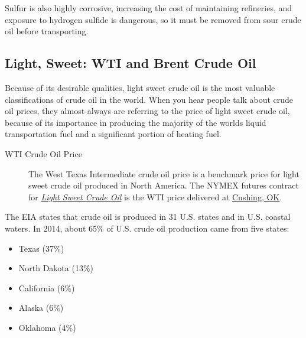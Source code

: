 \documentclass[
  letterpaper,
  DIV=11,
  numbers=noendperiod]{scrreprt}
\providecommand{\tightlist}{%
  \setlength{\itemsep}{0pt}\setlength{\parskip}{0pt}}\usepackage{longtable,booktabs,array}
\begin{document}
Sulfur is also highly corrosive, increasing the cost of maintaining
refineries, and exposure to hydrogen sulfide is dangerous, so it must be
removed from sour crude oil before transporting.

\hypertarget{light-sweet-wti-and-brent-crude-oil}{%
\subsection{Light, Sweet: WTI and Brent Crude
Oil}\label{light-sweet-wti-and-brent-crude-oil}}

Because of its desirable qualities, light sweet crude oil is the most
valuable classifications of crude oil in the world. When you hear people
talk about crude oil prices, they almost always are referring to the
price of light sweet crude oil, because of its importance in producing
the majority of the worlds liquid transportation fuel and a significant
portion of heating fuel.

\begin{description}
\item[WTI Crude Oil Price]
The West Texas Intermediate crude oil price is a benchmark price for
light sweet crude oil produced in North America. The NYMEX futures
contract for
\href{http://www.cmegroup.com/trading/energy/crude-oil/light-sweet-crude.html}{\emph{Light
Sweet Crude Oil}} is the WTI price delivered at
\href{https://www.google.com/maps/place/Cushing,+OK+74023/@43.8498418,-87.2836175,5.17z/data=!4m2!3m1!1s0x87b169f80014c5c1:0xfe855f1914b195a}{Cushing,
OK}.
\end{description}

The EIA states that crude oil is produced in 31 U.S. states and in U.S.
coastal waters. In 2014, about 65\% of U.S. crude oil production came
from five states:

\begin{itemize}
\tightlist
\item
  Texas (37\%)
\item
  North Dakota (13\%)
\item
  California (6\%)
\item
  Alaska (6\%)
\item
  Oklahoma (4\%)
\end{itemize}
\end{document}
